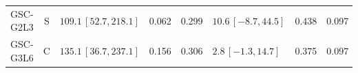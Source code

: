 \begin{longtable}{lcp{37mm}rrp{37mm}rr}
GSC-G2L3 & S & \(109.1\,[52.7,218.1]\) & 0.062 & 0.299 & \(10.6\,[-8.7,44.5]\) & 0.438 & 0.097\\
GSC-G3L6 & C & \(135.1\,[36.7,237.1]\) & 0.156 & 0.306 & \(2.8\,[-1.3,14.7]\) & 0.375 & 0.097\\

\end{longtable}

